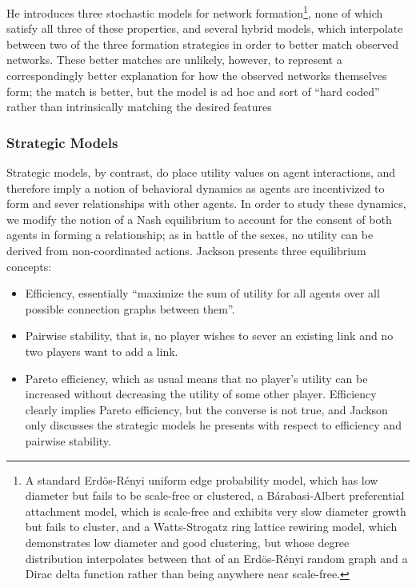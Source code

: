 \documentclass[11pt]{article}
\begin{document}
He introduces three stochastic models for network formation\footnote{A standard Erd\"{o}s-R\'{e}nyi uniform edge probability model, which has low diameter but fails to be scale-free or clustered, a B\'{a}rabasi-Albert preferential attachment model, which is scale-free and exhibits very slow diameter growth but fails to cluster, and a Watts-Strogatz ring lattice rewiring model, which demonstrates low diameter and good clustering, but whose degree distribution interpolates between that of an Erd\"{o}s-R\'{e}nyi random graph and a Dirac delta function rather than being anywhere near scale-free.}, none of which satisfy all three of these properties, and several hybrid models, which interpolate between two of the three formation strategies in order to better match observed networks. These better matches are unlikely, however, to represent a correspondingly better explanation for how the observed networks themselves form; the match is better, but the model is ad hoc and sort of ``hard coded'' rather than intrinsically matching the desired features

\subsubsection*{Strategic Models}

Strategic models, by contrast, do place utility values on agent interactions, and therefore imply a notion of behavioral dynamics as agents are incentivized to form and sever relationships with other agents.  In order to study these dynamics, we modify the notion of a Nash equilibrium to account for the consent of both agents in forming a relationship; as in battle of the sexes, no utility can be derived from non-coordinated actions. Jackson presents three equilibrium concepts: 

\begin{itemize}
\item Efficiency, essentially ``maximize the sum of utility for all agents over all possible connection graphs between them''.
\item Pairwise stability, that is, no player wishes to sever an existing link and no two players want to add a link. 
\item Pareto efficiency, which as usual means that no player's utility can be increased without decreasing the utility of some other player. Efficiency clearly implies Pareto efficiency, but the converse is not true, and Jackson only discusses the strategic models he presents with respect to efficiency and pairwise stability.
\end{itemize}
\end{document}

